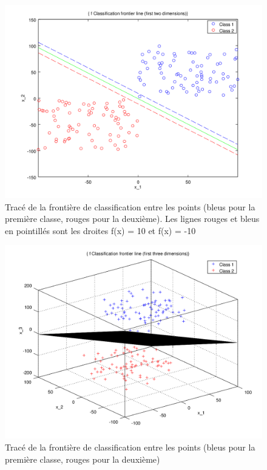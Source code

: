 \documentclass{article}
\begin{document}
         \begin{figure}
           \begin{center}
             \includegraphics[scale=0.5]{images/line2.png}
             \caption{Tracé de la frontière de classification entre les points (bleus pour la première classe, rouges pour la deuxième). Les lignes rouges et bleus en pointillés sont les droites f(x) = 10 et f(x) = -10}
           \end{center}
         \end{figure}

         \begin{figure}
           \begin{center}
             \includegraphics[scale=0.5]{images/plane2.png}
             \caption{Tracé de la frontière de classification entre les points (bleus pour la première classe, rouges pour la deuxième)}
           \end{center}
         \end{figure}
\end{document}
